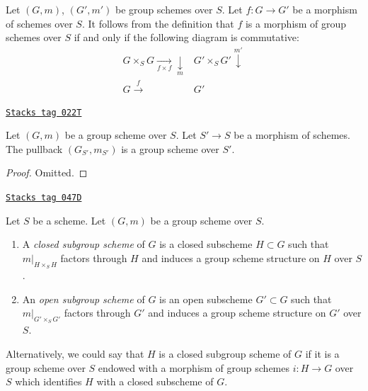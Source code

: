 \medskip\noindent
Let $(G, m)$, $(G', m')$ be group schemes over $S$.
Let $f : G \to G'$ be a morphism of schemes over $S$.
It follows from the definition that $f$ is a morphism
of group schemes over $S$ if and only if the following diagram
is commutative:
$$
\begin{array}{cc}G \times_S G \underset{f \times f}{\longrightarrow}\underset{m}{\downarrow} & G' \times_S G' \overset{m'}{\downarrow} \\ G \overset{f}{\longrightarrow} & G'\end{array}
$$

\begin{lemma}
\label{groupoids-lemma-base-change-group-scheme}
\href{https://stacks.math.columbia.edu/tag/022T}{\texttt{Stacks tag 022T}}

Let $(G, m)$ be a group scheme over $S$.
Let $S' \to S$ be a morphism of schemes.
The pullback $(G_{S'}, m_{S'})$ is a group scheme over $S'$.
\end{lemma}

\begin{proof}
Omitted.
\end{proof}

\begin{definition}
\label{groupoids-definition-closed-subgroup-scheme}
\href{https://stacks.math.columbia.edu/tag/047D}{\texttt{Stacks tag 047D}}

Let $S$ be a scheme. Let $(G, m)$ be a group scheme over $S$.
\begin{enumerate}
\item A {\it closed subgroup scheme} of $G$ is a closed subscheme
$H \subset G$ such that $m|_{H \times_S H}$ factors through $H$ and induces a
group scheme structure on $H$ over $S$.
\item An {\it open subgroup scheme} of $G$ is an open subscheme
$G' \subset G$ such that $m|_{G' \times_S G'}$ factors through $G'$
and induces a group scheme structure on $G'$ over $S$.
\end{enumerate}
\end{definition}

Alternatively, we could say that $H$ is a closed subgroup scheme of $G$
if it is a group scheme over $S$ endowed with a morphism of group schemes
$i : H \to G$ over $S$ which identifies $H$ with a closed subscheme of $G$.


